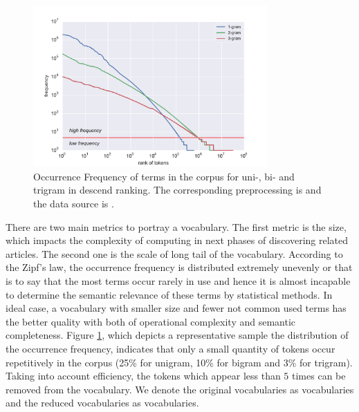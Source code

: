 \begin{figure}[!htb]
    \centering
    \includegraphics[width=0.8\textwidth]{fig/freqdist}
    \caption{Occurrence Frequency of terms in the corpus for uni-, bi- and trigram in descend ranking. The corresponding preprocessing is \iSE{} and the data source is \icontent{}.}
    \label{fig:freqdist}
\end{figure}

There are two main metrics to portray a vocabulary. The first metric is the size, which impacts the complexity of computing in next phases of discovering related articles. The second one is the scale of long tail of the vocabulary. According to the Zipf's law, the occurrence frequency is distributed extremely unevenly or that is to say that the most terms occur rarely in use and hence it is almost incapable to determine the semantic relevance of these terms by statistical methods. In ideal case, a vocabulary with smaller size and fewer not common used terms has the better quality with both of operational complexity and semantic completeness. Figure \ref{fig:freqdist}, which depicts a representative sample the distribution of the occurrence frequency, indicates that only a small quantity of tokens occur repetitively in the corpus (25\% for unigram, 10\% for bigram and 3\% for trigram). Taking into account efficiency, the tokens which appear less than $5$ times can be removed from the vocabulary. We denote the original vocabularies as \ifull{} vocabularies and the reduced vocabularies as \icommon{} vocabularies. 

